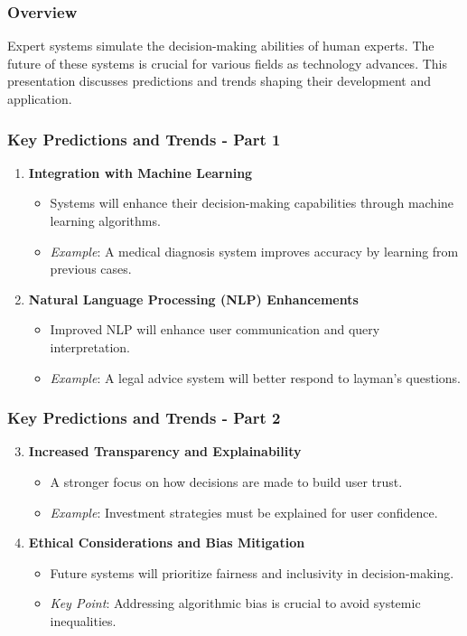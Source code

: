 \documentclass[aspectratio=169]{beamer}
\begin{document}
\begin{frame}[fragile]
    \frametitle{Overview}
    Expert systems simulate the decision-making abilities of human experts. The future of these systems is crucial for various fields as technology advances. 
    This presentation discusses predictions and trends shaping their development and application.
\end{frame}

\begin{frame}[fragile]
    \frametitle{Key Predictions and Trends - Part 1}
    \begin{enumerate}
        \item \textbf{Integration with Machine Learning}
        \begin{itemize}
            \item Systems will enhance their decision-making capabilities through machine learning algorithms.
            \item \textit{Example}: A medical diagnosis system improves accuracy by learning from previous cases.
        \end{itemize}
        
        \item \textbf{Natural Language Processing (NLP) Enhancements}
        \begin{itemize}
            \item Improved NLP will enhance user communication and query interpretation.
            \item \textit{Example}: A legal advice system will better respond to layman’s questions.
        \end{itemize}
    \end{enumerate}
\end{frame}

\begin{frame}[fragile]
    \frametitle{Key Predictions and Trends - Part 2}
    \begin{enumerate}
        \setcounter{enumi}{2}
        \item \textbf{Increased Transparency and Explainability}
        \begin{itemize}
            \item A stronger focus on how decisions are made to build user trust.
            \item \textit{Example}: Investment strategies must be explained for user confidence.
        \end{itemize}
        
        \item \textbf{Ethical Considerations and Bias Mitigation}
        \begin{itemize}
            \item Future systems will prioritize fairness and inclusivity in decision-making.
            \item \textit{Key Point}: Addressing algorithmic bias is crucial to avoid systemic inequalities.
        \end{itemize}
    \end{enumerate}
\end{frame}
\end{document}
